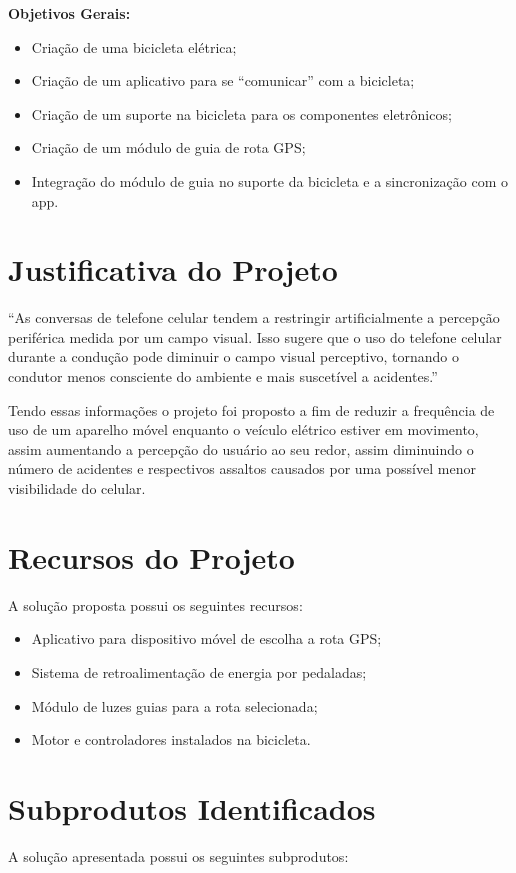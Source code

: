 \begin{apendicesenv}
\textbf{Objetivos Gerais:}
\begin{itemize}
  \item Criação de uma bicicleta elétrica;
  \item Criação de um aplicativo para se “comunicar” com a bicicleta;
  \item Criação de um suporte na bicicleta para os componentes eletrônicos;
  \item Criação de um módulo de guia de rota GPS;
  \item Integração do módulo de guia no suporte da bicicleta e a sincronização com o app. 
\end{itemize}

\section{Justificativa do Projeto}
“As conversas de telefone celular tendem a restringir artificialmente a percepção periférica medida por um campo visual. Isso sugere que o uso do telefone celular durante a condução pode diminuir o campo visual perceptivo, tornando o condutor menos consciente do ambiente e mais suscetível a acidentes.” \cite{maples2008effects} 

	Tendo essas informações o projeto foi proposto a fim de reduzir a frequência de uso de um aparelho móvel enquanto o veículo elétrico estiver em movimento, assim aumentando a percepção do usuário ao seu redor, assim diminuindo o número de acidentes e respectivos assaltos causados por uma possível menor visibilidade do celular.

\section{Recursos do Projeto}
A solução proposta possui os seguintes recursos:
\begin{itemize}
	\item Aplicativo para dispositivo móvel de escolha a rota GPS;
	\item Sistema de retroalimentação de energia por pedaladas;
	\item Módulo de luzes guias para a rota selecionada;
	\item Motor e controladores instalados na bicicleta.
\end{itemize}

\section{Subprodutos Identificados}
A solução apresentada possui os seguintes subprodutos:


\end{apendicesenv}
